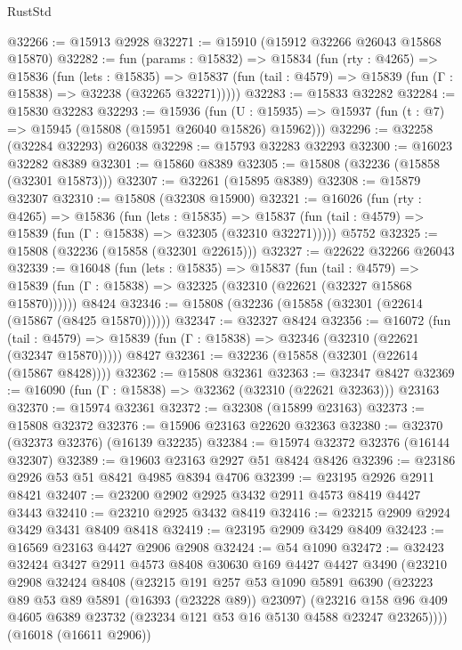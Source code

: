 \begin{lexlean}{RustStd}
\begin{coremodule}
@32266 := @15913 @2928
@32271 := @15910 (@15912 @32266 @26043 @15868 @15870)
@32282 := fun (params : @15832) =>
  @15834
    (fun (rty : @4265) =>
    @15836
      (fun (lets : @15835) =>
      @15837 (fun (tail : @4579) => @15839 (fun (Γ : @15838) => @32238 (@32265 @32271)))))
@32283 := @15833 @32282
@32284 := @15830 @32283
@32293 := @15936
    (fun (U : @15935) => @15937 (fun (t : @7) => @15945 (@15808 (@15951 @26040 @15826) @15962)))
@32296 := @32258 (@32284 @32293) @26038
@32298 := @15793 @32283 @32293
@32300 := @16023 @32282 @8389
@32301 := @15860 @8389
@32305 := @15808 (@32236 (@15858 (@32301 @15873)))
@32307 := @32261 (@15895 @8389)
@32308 := @15879 @32307
@32310 := @15808 (@32308 @15900)
@32321 := @16026
    (fun (rty : @4265) =>
    @15836
      (fun (lets : @15835) =>
      @15837 (fun (tail : @4579) => @15839 (fun (Γ : @15838) => @32305 (@32310 @32271)))))
    @5752
@32325 := @15808 (@32236 (@15858 (@32301 @22615)))
@32327 := @22622 @32266 @26043
@32339 := @16048
    (fun (lets : @15835) =>
    @15837
      (fun (tail : @4579) =>
      @15839 (fun (Γ : @15838) => @32325 (@32310 (@22621 (@32327 @15868 @15870))))))
    @8424
@32346 := @15808 (@32236 (@15858 (@32301 (@22614 (@15867 (@8425 @15870))))))
@32347 := @32327 @8424
@32356 := @16072
    (fun (tail : @4579) => @15839 (fun (Γ : @15838) => @32346 (@32310 (@22621 (@32347 @15870)))))
    @8427
@32361 := @32236 (@15858 (@32301 (@22614 (@15867 @8428))))
@32362 := @15808 @32361
@32363 := @32347 @8427
@32369 := @16090 (fun (Γ : @15838) => @32362 (@32310 (@22621 @32363))) @23163
@32370 := @15974 @32361
@32372 := @32308 (@15899 @23163)
@32373 := @15808 @32372
@32376 := @15906 @23163 @22620 @32363
@32380 := @32370 (@32373 @32376) (@16139 @32235)
@32384 := @15974 @32372 @32376 (@16144 @32307)
@32389 := @19603 @23163 @2927 @51 @8424 @8426
@32396 := @23186 @2926 @53 @51 @8421 @4985 @8394 @4706
@32399 := @23195 @2926 @2911 @8421
@32407 := @23200 @2902 @2925 @3432 @2911 @4573 @8419 @4427 @3443
@32410 := @23210 @2925 @3432 @8419
@32416 := @23215 @2909 @2924 @3429 @3431 @8409 @8418
@32419 := @23195 @2909 @3429 @8409
@32423 := @16569 @23163 @4427 @2906 @2908
@32424 := @54 @1090
@32472 := @32423
    @32424
    @3427
    @2911
    @4573
    @8408
    @30630
    @169
    @4427
    @4427
    @3490
    (@23210
      @2908
      @32424
      @8408
      (@23215
        @191
        @257
        @53
        @1090
        @5891
        @6390
        (@23223 @89 @53 @89 @5891 (@16393 (@23228 @89)) @23097)
        (@23216 @158 @96 @409 @4605 @6389 @23732 (@23234 @121 @53 @16 @5130 @4588 @23247 @23265))))
    (@16018 (@16611 @2906))

\end{coremodule}
\end{lexlean}
